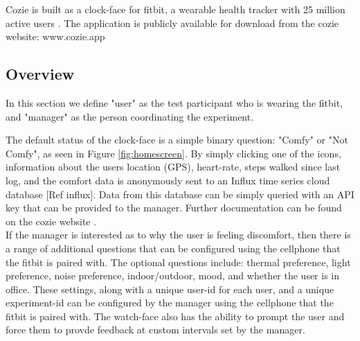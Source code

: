 
Cozie is built as a clock-face for fitbit, a wearable health tracker with 25 million active users \cite{fibit2018}. The application is publicly available for download from the cozie website: www.cozie.app

\subsection{Overview}

In this section we define "user" as the test participant who is wearing the fitbit, and "manager" as the person coordinating the experiment. \ 

The default status of the clock-face is a simple binary question: "Comfy" or "Not Comfy", as seen in Figure \ref{fig:homescreen}. By simply clicking one of the icons, information about the users location (GPS), heart-rate, steps walked since last log, and the comfort data is anonymously sent to an Influx time series cloud database [Ref influx]. Data from this database can be simply queried with an API key that can be provided to the manager. Further documentation can be found on the cozie website \cite{cozieweb}.\\

If the manager is interested as to why the user is feeling discomfort, then there is a range of additional questions that can be configured using the cellphone that the fitbit is paired with. The optional questions include: thermal preference, light preference, noise preference, indoor/outdoor, mood, and whether the user is in office. These settings, along with a unique user-id for each user, and a unique experiment-id can be configured by the manager using the cellphone that the fitbit is paired with. The watch-face also has the ability to prompt the user and force them to provde feedback at custom intervals set by the manager.


